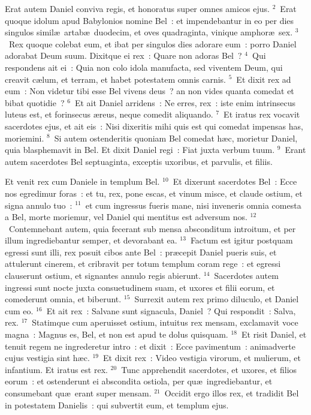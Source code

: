 \lettrine[lines=10,image=true,loversize=0.05,lraise=-0.03]{E}{}rat autem Daniel conviva regis, et honoratus super omnes amicos ejus.
${}^{2}$~Erat quoque idolum apud Babylonios nomine Bel~: et impendebantur in eo per dies singulos simil\ae\ artab\ae\ duodecim, et oves quadraginta, vinique amphor\ae\ sex.
${}^{3}$~Rex quoque colebat eum, et ibat per singulos dies adorare eum~: porro Daniel adorabat Deum suum. Dixitque ei rex~: Quare non adoras Bel~?
${}^{4}$~Qui respondens ait ei~: Quia non colo idola manufacta, sed viventem Deum, qui creavit c\ae lum, et terram, et habet potestatem omnis carnis.
${}^{5}$~Et dixit rex ad eum~: Non videtur tibi esse Bel vivens deus~? an non vides quanta comedat et bibat quotidie~?
${}^{6}$~Et ait Daniel arridens~: Ne erres, rex~: iste enim intrinsecus luteus est, et forinsecus \ae reus, neque comedit aliquando.
${}^{7}$~Et iratus rex vocavit sacerdotes ejus, et ait eis~: Nisi dixeritis mihi quis est qui comedat impensas has, moriemini.
${}^{8}$~Si autem ostenderitis quoniam Bel comedat h\ae c, morietur Daniel, quia blasphemavit in Bel. Et dixit Daniel regi~: Fiat juxta verbum tuum.
${}^{9}$~Erant autem sacerdotes Bel septuaginta, exceptis uxoribus, et parvulis, et filiis.

 Et venit rex cum Daniele in templum Bel.
${}^{10}$~Et dixerunt sacerdotes Bel~: Ecce nos egredimur foras~: et tu, rex, pone escas, et vinum misce, et claude ostium, et signa annulo tuo~:
${}^{11}$~et cum ingressus fueris mane, nisi inveneris omnia comesta a Bel, morte moriemur, vel Daniel qui mentitus est adversum nos.
${}^{12}$~Contemnebant autem, quia fecerant sub mensa absconditum introitum, et per illum ingrediebantur semper, et devorabant ea.
${}^{13}$~Factum est igitur postquam egressi sunt illi, rex posuit cibos ante Bel~: pr\ae cepit Daniel pueris suis, et attulerunt cinerem, et cribravit per totum templum coram rege~: et egressi clauserunt ostium, et signantes annulo regis abierunt.
${}^{14}$~Sacerdotes autem ingressi sunt nocte juxta consuetudinem suam, et uxores et filii eorum, et comederunt omnia, et biberunt.
${}^{15}$~Surrexit autem rex primo diluculo, et Daniel cum eo.
${}^{16}$~Et ait rex~: Salvane sunt signacula, Daniel~? Qui respondit~: Salva, rex.
${}^{17}$~Statimque cum aperuisset ostium, intuitus rex mensam, exclamavit voce magna~: Magnus es, Bel, et non est apud te dolus quisquam.
${}^{18}$~Et risit Daniel, et tenuit regem ne ingrederetur intro~: et dixit~: Ecce pavimentum~: animadverte cujus vestigia sint h\ae c.
${}^{19}$~Et dixit rex~: Video vestigia virorum, et mulierum, et infantium. Et iratus est rex.
${}^{20}$~Tunc apprehendit sacerdotes, et uxores, et filios eorum~: et ostenderunt ei abscondita ostiola, per qu\ae\ ingrediebantur, et consumebant qu\ae\ erant super mensam.
${}^{21}$~Occidit ergo illos rex, et tradidit Bel in potestatem Danielis~: qui subvertit eum, et templum ejus.



